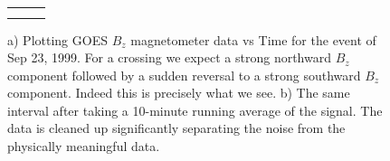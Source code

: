 \documentclass[12pt, letterpaper]{article}
\begin{document}
\begin{figure}
\def\tabularxcolumn#1{m{#1}}
\begin{tabularx}{\linewidth}{@{}cXX@{}}
\begin{tabular}{cc}
   & \\
\end{tabular}
\end{tabularx}
\caption{a) Plotting GOES $B_{z}$ magnetometer data vs Time for the event of Sep 23, 1999. For a crossing we expect a strong northward $B_{z}$ component followed by a sudden reversal to a strong southward $B_{z}$ component. Indeed this is precisely what we see. b) The same interval after taking a 10-minute running average of the signal. The data is cleaned up significantly separating the noise from the physically meaningful data.} 
\label{fig:GOES_Bz}
\end{figure}
\end{document}
